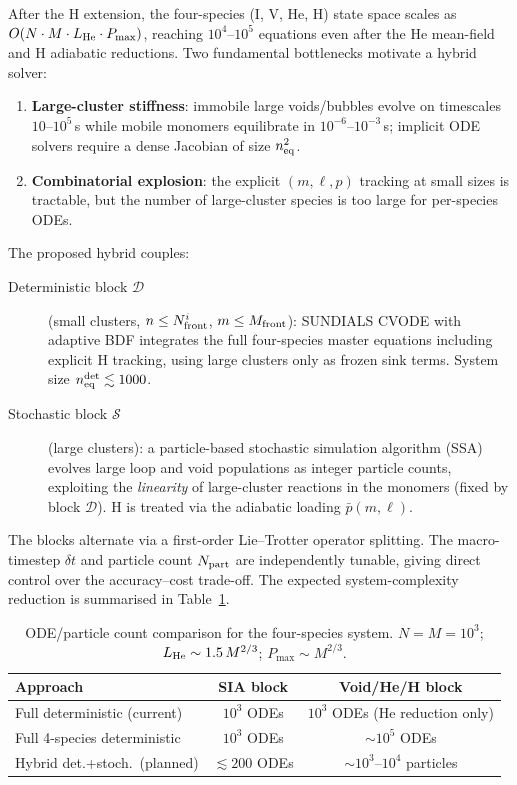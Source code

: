 \documentclass[12pt,letterpaper]{article}
\begin{document}
After the H extension, the four-species (I, V, He, H) state space scales
as $O(N\cdot M\cdot L_{\rm He}\cdot P_{\max})$, reaching $10^4$--$10^5$
equations even after the He mean-field and H adiabatic reductions.  Two
fundamental bottlenecks motivate a hybrid solver:
\begin{enumerate}
  \item \textbf{Large-cluster stiffness}: immobile large voids/bubbles
    evolve on timescales $10$--$10^5$\,s while mobile monomers equilibrate
    in $10^{-6}$--$10^{-3}$\,s; implicit ODE solvers require a dense
    Jacobian of size $n_{\rm eq}^2$.
  \item \textbf{Combinatorial explosion}: the explicit $(m,\ell,p)$
    tracking at small sizes is tractable, but the number of large-cluster
    species is too large for per-species ODEs.
\end{enumerate}

The proposed hybrid couples:
\begin{description}
  \item[Deterministic block $\mathcal{D}$] (small clusters,
    $n \leq N_{\rm front}^i$, $m \leq M_{\rm front}$): SUNDIALS CVODE
    with adaptive BDF integrates the full four-species master equations
    including explicit H tracking, using large clusters only as frozen
    sink terms.  System size $n_{\rm eq}^{\rm det} \lesssim 1000$.
  \item[Stochastic block $\mathcal{S}$] (large clusters): a
    particle-based stochastic simulation algorithm (SSA) evolves large
    loop and void populations as integer particle counts, exploiting the
    \emph{linearity} of large-cluster reactions in the monomers (fixed
    by block $\mathcal{D}$).  H is treated via the adiabatic loading
    $\bar{p}(m,\ell)$.
\end{description}
The blocks alternate via a first-order Lie--Trotter operator splitting.
The macro-timestep $\delta t$ and particle count $N_{\rm part}$ are
independently tunable, giving direct control over the accuracy--cost
trade-off.  The expected system-complexity reduction is summarised in
Table~\ref{tab:complexity}.

\begin{table}[htbp]
\centering
\caption{ODE/particle count comparison for the four-species system.
$N = M = 10^3$; $L_{\rm He} \sim 1.5\,M^{2/3}$; $P_{\max} \sim M^{2/3}$.}
\label{tab:complexity}
\renewcommand{\arraystretch}{1.2}
\begin{tabular}{@{}lcc@{}}
\toprule
\textbf{Approach} & \textbf{SIA block} & \textbf{Void/He/H block} \\
\midrule
Full deterministic (current) & $10^3$ ODEs & $10^3$ ODEs (He reduction only) \\
Full 4-species deterministic & $10^3$ ODEs & $\sim 10^5$ ODEs \\
\color{plancolor}Hybrid det.+stoch.\ (planned)
  & \color{plancolor}$\lesssim 200$ ODEs
  & \color{plancolor}$\sim 10^3$--$10^4$ particles \\
\bottomrule
\end{tabular}
\end{table}
\end{document}
